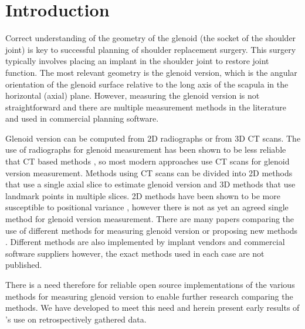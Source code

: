 \section{Introduction}
\label{sec:introduction}
Correct understanding of the geometry of the glenoid (the socket of the shoulder joint) is
key to successful planning of shoulder replacement surgery. This surgery typically involves
placing an implant in the shoulder joint to restore joint function. The most relevant
geometry is the glenoid version, which is the angular orientation of the glenoid surface
relative to the long axis of the scapula in the horizontal (axial) plane. 
However, measuring the glenoid version is not
straightforward and there are multiple measurement methods in the literature and used in
commercial planning software. 

Glenoid version can be computed from {2D} radiographs or from {3D} {CT} scans.
The use of radiographs for glenoid measurement has been shown to be less 
reliable that {CT} based methods \cite{nyffeler2003measurement}, so 
most modern approaches use {CT} scans for glenoid version measurement. 
Methods using {CT} scans can be divided into {2D} methods that 
use a single axial slice to estimate glenoid version and {3D} 
methods that use landmark points in multiple slices. {2D} methods 
have been shown to be more susceptible to positional variance \cite{bryce2010two}, 
however there is not as yet an agreed single method for glenoid version measurement.
There are many papers comparing the use of
different methods for measuring glenoid version or proposing new 
methods \cite{PMID:33330245, PMID:32010231, PMID:29298261, PMID:33554174}. 
Different methods are also implemented by implant vendors and commercial 
software suppliers \cite{blueprint, exactech, djosurgical} however, the exact methods
used in each case are not published. 

There is a need therefore for reliable open source implementations of the various 
methods for measuring glenoid version to enable further research comparing the methods. 
We have developed \sksglenoid to meet this need and herein present early results of \sksglenoidns's 
use on retrospectively gathered data.
